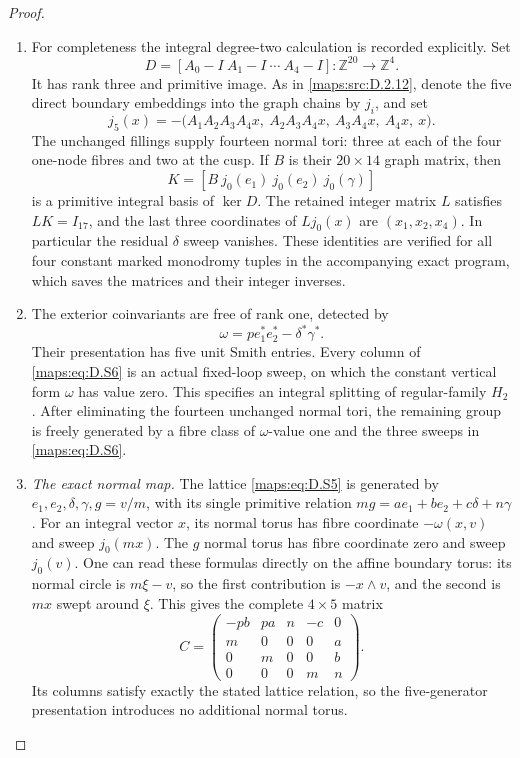 \begin{proof}
\begin{enumerate}[label=\arabic*.,leftmargin=*]
\item For completeness the integral degree-two calculation is
recorded explicitly. Set
\[
 D=[A_0-I\ A_1-I\ \cdots\ A_4-I]:\mathbb Z^{20}\to\mathbb Z^4.
\]
It has rank three and primitive image. As in \ref{maps:src:D.2.12}, denote
the five direct boundary embeddings into the graph chains by
$j_i$, and set
\[
 j_5(x)=-\bigl(A_1A_2A_3A_4x,\ A_2A_3A_4x,
                      \ A_3A_4x,\ A_4x,\ x\bigr).
\]
The unchanged fillings supply fourteen normal tori: three
at each of the four one-node fibres and two at the cusp.
If $B$ is their $20\times14$ graph matrix, then
\[
 K=[B\ j_0(e_1)\ j_0(e_2)\ j_0(\gamma)]
 \tag{D.S6}\label{maps:eq:D.S6}
\]
is a primitive integral basis of $\ker D$.
The retained integer matrix $L$ satisfies $LK=I_{17}$,
and the last three coordinates of $Lj_0(x)$ are
$(x_1,x_2,x_4)$. In particular the residual $\delta$ sweep
vanishes. These identities are verified for all four
constant marked monodromy tuples in the accompanying exact
program, which saves the matrices and their integer inverses.

\item The exterior coinvariants are free of rank one, detected by
\[
 \omega=p e_1^*e_2^*-\delta^*\gamma^*.
\]
Their presentation has five unit Smith entries. Every column
of \eqref{maps:eq:D.S6} is an actual fixed-loop sweep, on which the constant
vertical form $\omega$ has value zero. This specifies an
integral splitting of regular-family $H_2$.
After eliminating the fourteen unchanged normal tori,
the remaining group is freely generated by a fibre class
of $\omega$-value one and the three sweeps in \eqref{maps:eq:D.S6}.

\item \emph{The exact normal map.}
The lattice \eqref{maps:eq:D.S5} is generated by $e_1,e_2,\delta,\gamma,g=v/m$,
with its single primitive relation
$mg=a e_1+b e_2+c\delta+n\gamma$.
For an integral vector $x$, its normal torus has fibre
coordinate $-\omega(x,v)$ and sweep $j_0(mx)$.
The $g$ normal torus has fibre coordinate zero and sweep
$j_0(v)$. One can read these formulas directly on the
affine boundary torus: its normal circle is $m\xi-v$,
so the first contribution is $-x\wedge v$, and the second
is $mx$ swept around $\xi$. This gives the complete
$4\times5$ matrix
\[
 C=\begin{pmatrix}
 -pb&pa&n&-c&0\\
 m&0&0&0&a\\
 0&m&0&0&b\\
 0&0&0&m&n
 \end{pmatrix}.
 \tag{D.S7}\label{maps:eq:D.S7}
\]
Its columns satisfy exactly the stated lattice relation,
so the five-generator presentation introduces no additional
normal torus.


\end{enumerate}
\end{proof}

